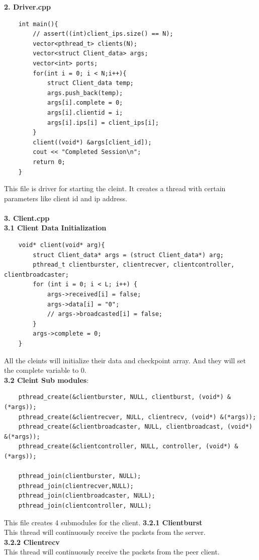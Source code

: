 \documentclass[12pt]{scrartcl}
\begin{document}
\textbf{2. Driver.cpp}\\
\begin{verbatim}
    int main(){
        // assert((int)client_ips.size() == N);
        vector<pthread_t> clients(N);
        vector<struct Client_data> args;
        vector<int> ports;
        for(int i = 0; i < N;i++){
            struct Client_data temp;
            args.push_back(temp);
            args[i].complete = 0;
            args[i].clientid = i;
            args[i].ips[i] = client_ips[i];
        }
        client((void*) &args[client_id]);
        cout << "Completed Session\n";
        return 0;
    }
\end{verbatim}
This file is driver for starting the cleint. It creates a thread with certain parameters like client id and ip address.\\
\\
\textbf{3. Client.cpp}\\
\textbf{3.1 Client Data Initialization}
\begin{verbatim}
    void* client(void* arg){
        struct Client_data* args = (struct Client_data*) arg;
        pthread_t clientburster, clientrecver, clientcontroller, clientbroadcaster;
        for (int i = 0; i < L; i++) {
            args->received[i] = false;
            args->data[i] = "0";
            // args->broadcasted[i] = false;
        }
        args->complete = 0;
    }
\end{verbatim}
All the cleints will initialize their data and checkpoint array. And they will set the complete variable to 0.\\
\textbf{3.2 Cleint Sub modules}:
\begin{verbatim}
    pthread_create(&clientburster, NULL, clientburst, (void*) &(*args));
    pthread_create(&clientrecver, NULL, clientrecv, (void*) &(*args));
    pthread_create(&clientbroadcaster, NULL, clientbroadcast, (void*) &(*args));
    pthread_create(&clientcontroller, NULL, controller, (void*) &(*args));

    pthread_join(clientburster, NULL);
    pthread_join(clientrecver,NULL);
    pthread_join(clientbroadcaster, NULL);
    pthread_join(clientcontroller, NULL);
\end{verbatim}
This file creates 4 submodules for the client.
\textbf{3.2.1 Clientburst}\\
This thread will continuously receive the packets from the server.\\
\textbf{3.2.2 Clientrecv}\\
This thread will continuously receive the packets from the peer client.\\
\end{document}
